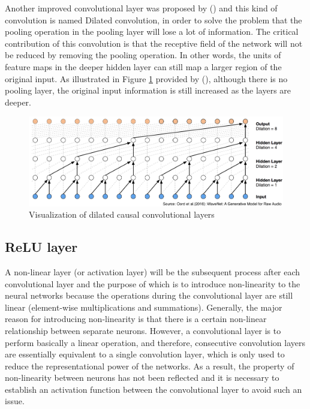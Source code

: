 \documentclass[]{krantz}
\begin{document}
Another improved convolutional layer was proposed by (\citet{Kalchbrenner2016NeuralMT}) and this kind of convolution is named Dilated convolution, in order to solve the problem that the pooling operation in the pooling layer will lose a lot of information. The critical contribution of this convolution is that the receptive field of the network will not be reduced by removing the pooling operation. In other words, the units of feature maps in the deeper hidden layer can still map a larger region of the original input. As illustrated in Figure \ref{fig:figs-dilated} provided by (\citet{Oord2016WaveNetAG}), although there is no pooling layer, the original input information is still increased as the layers are deeper.

\begin{figure}[ht]

{\centering \includegraphics[width=0.65\linewidth]{figures/01-03-cnns-and-their-applications-in-nlp/Temporal} 

}

\caption{Visualization of dilated causal convolutional layers}\label{fig:figs-dilated}
\end{figure}

\hypertarget{relu-layer}{%
\subsection{ReLU layer}\label{relu-layer}}

A non-linear layer (or activation layer) will be the subsequent process after each convolutional layer and the purpose of which is to introduce non-linearity to the neural networks because the operations during the convolutional layer are still linear (element-wise multiplications and summations). Generally, the major reason for introducing non-linearity is that there is a certain non-linear relationship between separate neurons. However, a convolutional layer is to perform basically a linear operation, and therefore, consecutive convolution layers are essentially equivalent to a single convolution layer, which is only used to reduce the representational power of the networks. As a result, the property of non-linearity between neurons has not been reflected and it is necessary to establish an activation function between the convolutional layer to avoid such an issue.
\end{document}
